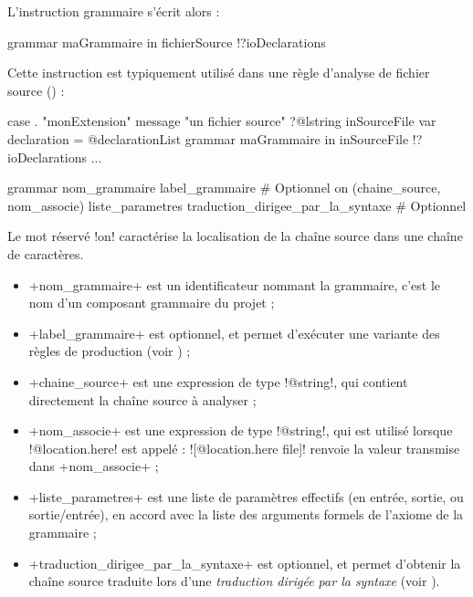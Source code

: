 L'instruction grammaire s'écrit alors :
\begin{galgas}
grammar maGrammaire in fichierSource !?ioDeclarations
\end{galgas}

Cette instruction est typiquement utilisé dans une règle d'analyse de fichier source () :

\begin{galgas}
case . "monExtension"
message "un fichier source"
?@lstring inSourceFile {
  var declaration = @declarationList {}
  grammar maGrammaire in inSourceFile !?ioDeclarations
  ...
}
\end{galgas}




\begin{galgasbox}
grammar
  nom_grammaire
  label_grammaire # Optionnel
  on (chaine_source, nom_associe)
  liste_parametres
  traduction_dirigee_par_la_syntaxe # Optionnel
\end{galgasbox}

Le mot réservé \ggs!on! caractérise la localisation de la chaîne source dans une chaîne de caractères.
\begin{itemize}
  \item \ggs+nom_grammaire+ est un identificateur nommant la grammaire, c'est le nom d'un composant grammaire du projet ;
  \item \ggs+label_grammaire+ est optionnel, et permet d'exécuter une variante des règles de production (voir ) ;
  \item \ggs+chaine_source+ est une expression de type \ggs!@string!, qui contient directement la chaîne source à analyser ;
  \item \ggs+nom_associe+ est une expression de type \ggs!@string!, qui est utilisé lorsque \ggs!@location.here! est appelé : \ggs![@location.here file]! renvoie la valeur transmise dans \ggs+nom_associe+ ;
  \item \ggs+liste_parametres+ est une liste de paramètres effectifs (en entrée, sortie, ou sortie/entrée), en accord avec la liste des arguments formels de l'axiome de la grammaire ;
  \item \ggs+traduction_dirigee_par_la_syntaxe+ est optionnel, et permet d'obtenir la chaîne source traduite lors d'une \emph{traduction dirigée par la syntaxe} (voir ).
\end{itemize}




